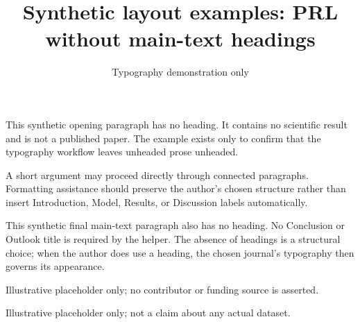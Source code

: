 \documentclass[aps,prl,reprint]{revtex4-2}
\begin{document}
\title{Synthetic layout examples: PRL without main-text headings}
\author{Typography demonstration only}\noaffiliation
\maketitle
This synthetic opening paragraph has no heading. It contains no scientific result and is not a published paper. The example exists only to confirm that the typography workflow leaves unheaded prose unheaded.

A short argument may proceed directly through connected paragraphs. Formatting assistance should preserve the author's chosen structure rather than insert Introduction, Model, Results, or Discussion labels automatically.

This synthetic final main-text paragraph also has no heading. No Conclusion or Outlook title is required by the helper. The absence of headings is a structural choice; when the author does use a heading, the chosen journal's typography then governs its appearance.

\begin{acknowledgments}
Illustrative placeholder only; no contributor or funding source is asserted.
\end{acknowledgments}
Illustrative placeholder only; not a claim about any actual dataset.
\end{document}

